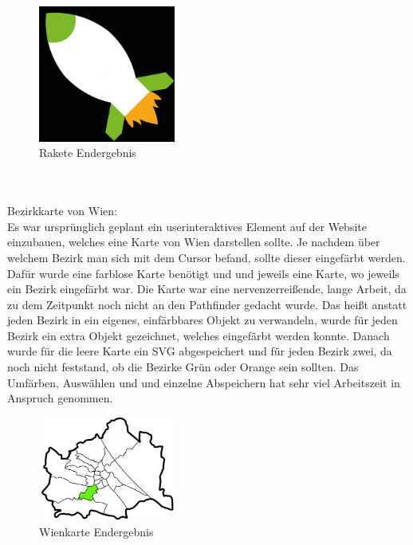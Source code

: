 \begin{figure}[H] 
  \centering
     \includegraphics[width=0.4\textwidth]{design_abb9.png}
  \caption{Rakete Endergebnis}
\end{figure}

\leavevmode \\
\leavevmode \\
Bezirkkarte von Wien:
\leavevmode \\
Es war ursprünglich geplant ein userinteraktives Element auf der Website einzubauen, welches eine Karte von Wien darstellen sollte. Je nachdem über welchem Bezirk man sich mit dem Cursor befand, sollte dieser eingefärbt werden. Dafür wurde eine farblose Karte benötigt und und jeweils eine Karte, wo jeweils ein Bezirk eingefärbt war. Die Karte war eine nervenzerreißende, lange Arbeit, da zu dem Zeitpunkt noch nicht an den Pathfinder gedacht wurde. Das heißt anstatt jeden Bezirk in ein eigenes, einfärbbares Objekt zu verwandeln, wurde für jeden Bezirk ein extra Objekt gezeichnet, welches eingefärbt werden konnte. Danach wurde für die leere Karte ein SVG abgespeichert und für jeden Bezirk zwei, da noch nicht feststand, ob die Bezirke Grün oder Orange sein sollten. Das Umfärben, Auswählen und und einzelne Abspeichern hat sehr viel Arbeitszeit in Anspruch genommen.

\begin{figure}[H] 
  \centering
     \includegraphics[width=0.4\textwidth]{design_abb10.png}
  \caption{Wienkarte Endergebnis}
\end{figure}